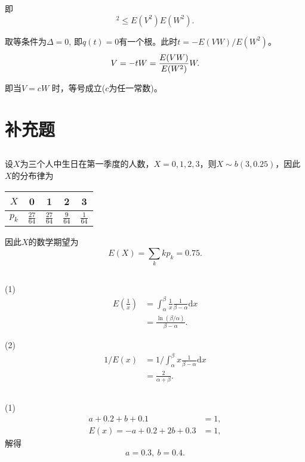 \documentclass[UTF8,a4paper,10pt]{ctexart}
\begin{document}
即
\begin{equation}
    [E(VW)]^2 \leq E(V^2) E(W^2).
\end{equation}

取等条件为$\Delta=0$, 即$q(t)=0$有一个根。此时$t= -E(VW)/E(W^2)$。
\begin{equation}
    V = -t W =  {E(VW)\over E(W^2)} W.
\end{equation}

即当$V=c W$ 时，等号成立($c$为任一常数)。

\section{补充题}

\subsection{}
设$X$为三个人中生日在第一季度的人数，$X = 0, 1, 2, 3$，则$X\sim b(3, 0.25)$，因此$X$的分布律为
\begin{center}
    \begin{tabular}{c|cccc}
        $X$ & 0 & 1 & 2 & 3 \\
        \hline
        $p_k$ & $\frac{27}{64}$ & $\frac{27}{64}$ & $\frac{9}{64}$ & $\frac{1}{64}$
    \end{tabular}
\end{center}

因此$X$的数学期望为
\begin{equation}
    E(X) = \sum_{k}kp_k = 0.75.
\end{equation}

\subsection{}
(1) 
\begin{align}
    E\left(\frac{1}{x}\right) &= \int_{\alpha}^{\beta} \frac{1}{x}\frac{1}{\beta - \alpha} \text{d} x \nonumber \\
                              &= \frac{\ln(\beta/\alpha)}{\beta - \alpha}.
\end{align}

(2)
\begin{align}
    1 / E(x) &= 1 / \int_{\alpha}^{\beta} x \frac{1}{\beta - \alpha} \text{d} x \nonumber \\
             &= \frac{2}{\alpha + \beta}.
\end{align}

\subsection{}
(1)
\begin{align}
    a + 0.2 + b + 0.1 &= 1, \\
    E(x) = -a + 0.2 + 2b + 0.3 &= 1,
\end{align}
解得
\begin{equation}
    a = 0.3,~b = 0.4.
\end{equation}
\end{document}

